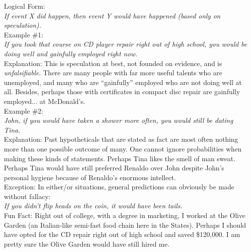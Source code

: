 \documentclass[a4paper,12pt,single,pdftex]{scrartcl}
\begin{document}
    
      Logical Form:
    \\

    
      {\em If event X did happen, then event Y would have happened (based only on speculation).}
    \\

    
      Example \#1:
    \\

    
      {\em If you took that course on CD player repair right out of high school, you would be doing well and gainfully employed right now.}
    \\

    
      Explanation: This is speculation at best, not founded on evidence, and is {\it unfalsifiable}.  There are many people with far more useful talents who are unemployed, and many who are “gainfully” employed who are not doing well at all. Besides, perhaps those with certificates in compact disc repair are gainfully employed... at McDonald’s.
    \\

    
      Example \#2:
    \\

    
      {\em John, if you would have taken a shower more often, you would still be dating Tina.}
    \\

    
      Explanation: Past hypotheticals that are stated as fact are most often nothing more than one possible outcome of many.  One cannot ignore probabilities when making these kinds of statements.  Perhaps Tina likes the smell of man sweat.  Perhaps Tina would have still preferred Renaldo over John despite John's personal hygiene because of Renaldo's enormous intellect.
    \\

    
      Exception: In either/or situations, general predictions can obviously be made without fallacy:
    \\

    
      {\em If you didn’t flip heads on the coin, it would have been tails.}
    \\

    
      Fun Fact: Right out of college, with a degree in marketing, I worked at the Olive Garden (an Italian-like semi-fast food chain here in the States). Perhaps I should have opted for the CD repair right out of high school and saved \$120,000. I am pretty sure the Olive Garden would have still hired me.
    \\
\end{document}
